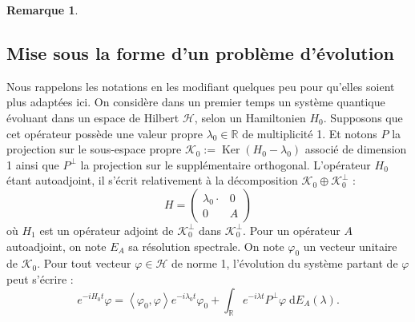 \documentclass[12pt,openany,a4paper, titlepage]{article}
\newcommand{\lp}{\left(}
\newcommand{\rp}{\right)}
\newcommand{\la}{\left\langle}
\newcommand{\ra}{\right\rangle}
\newcommand{\dd}{\;\mathrm{d}}
\newcommand{\R}{\mathbb{R}}
\newcommand{\vp}{\varphi}
\newcommand{\St}[2]{e^{-i #1 #2}}
\newcommand{\ortho}{P^\perp}
\newcommand{\Ker}{\operatorname{Ker}}
\theoremstyle{definition}
\theoremstyle{definition}
\theoremstyle{definition}
\theoremstyle{definition}
\theoremstyle{definition}
\newtheorem{rem}{Remarque}
\theoremstyle{definition}
\begin{document}
\begin{rem}
\subsection{Mise sous la forme d'un problème d'évolution}

Nous rappelons les notations en les modifiant quelques peu pour qu'elles soient plus adaptées ici. On considère dans un premier temps un système quantique évoluant dans un espace de Hilbert $\mathcal{H}$, selon un Hamiltonien $H_0$. Supposons que cet opérateur possède une valeur propre $\lambda_0 \in \R$ de multiplicité 1. Et notons $P$ la projection sur le sous-espace propre $\mathcal{K}_0 := \Ker\lp H_0 -\lambda_0\rp$ associé de dimension 1 ainsi que $\ortho$ la projection sur le supplémentaire orthogonal. L'opérateur $H_0$ étant autoadjoint, il s'écrit relativement à la décomposition $\mathcal{K}_0\oplus \mathcal{K}_0^\perp$ :
\begin{equation}
    H = \begin{pmatrix}
    \lambda_0 \cdot & 0 \\
    0 & A
\end{pmatrix}
\end{equation}
où $H_1$ est un opérateur adjoint de $\mathcal{K}_0^\perp$ dans $\mathcal{K}_0^\perp$. Pour un opérateur $A$ autoadjoint, on note $E_A$ sa résolution spectrale. On note $\vp_0$ un vecteur unitaire de $\mathcal{K}_0$. Pour tout vecteur $\varphi \in \mathcal{H}$ de norme 1, l'évolution du système partant de $\varphi$ peut s'écrire :
\begin{equation}
    \St{H_0}{t}\varphi = \la \vp_0, \varphi \ra \St{\lambda_0}{t} \vp_0 + \int_\R \St{\lambda}{t}\ortho \varphi \dd E_{A}(\lambda).
\end{equation}


\end{rem}
\end{document}
